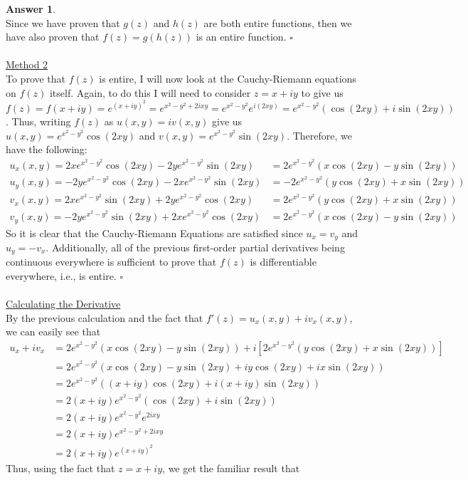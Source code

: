 \documentclass[10pt,a4paper]{article}
\theoremstyle{definition}
\newtheorem*{answer*}{Answer}
\begin{document}
\begin{answer*}{$ $}
\\Since we have proven that $g(z)$ and $h(z)$ are both entire functions, then we have also proven that $f(z) = g(h(z))$ is an entire function. $\square$
\\
\\\underline{Method 2}
\\To prove that $f(z)$ is entire, I will now look at the Cauchy-Riemann equations on $f(z)$ itself. Again, to do this I will need to consider $z = x + iy$ to give us $\displaystyle f(z) = f(x + iy) = e^{(x + iy)^2} = e^{x^2 - y^2 + 2ixy} = e^{x^2 - y^2}e^{i(2xy)} = e^{x^2 - y^2}(\cos(2xy) + i\sin(2xy))$. Thus, writing $f(z)$ as $u(x,y) = iv(x,y)$ give us $u(x,y) = e^{x^2 - y^2}\cos(2xy)$ and $v(x,y) = e^{x^2 - y^2}\sin(2xy)$. Therefore, we have the following:
\begin{align*}
u_x(x,y) = 2xe^{x^2 - y^2}\cos(2xy) - 2ye^{x^2 - y^2}\sin(2xy) &= 2e^{x^2 - y^2}(x\cos(2xy) - y\sin(2xy))\\
u_y(x,y) = -2ye^{x^2 - y^2}\cos(2xy) - 2xe^{x^2 - y^2}\sin(2xy) &= -2e^{x^2 - y^2}(y\cos(2xy) + x\sin(2xy))\\
v_x(x,y) = 2xe^{x^2 - y^2}\sin(2xy) + 2ye^{x^2 - y^2}\cos(2xy) &= 2e^{x^2 - y^2}(y\cos(2xy) + x\sin(2xy))\\
v_y(x,y) = -2ye^{x^2 - y^2}\sin(2xy) + 2xe^{x^2 - y^2}\cos(2xy) &= 2e^{x^2 - y^2}(x\cos(2xy) - y\sin(2xy))
\end{align*}
So it is clear that the Cauchy-Riemann Equations are satisfied since $u_x = v_y$ and $u_y = -v_x$. Additionally, all of the previous first-order partial derivatives being continuous everywhere is sufficient to prove that $f(z)$ is differentiable everywhere, i.e., is entire. $\square$
\\
\\\underline{Calculating the Derivative}
\\By the previous calculation and the fact that $f'(z) = u_x(x,y) + iv_x(x,y)$, we can easily see that
\begin{align*}
u_x + iv_x &= 2e^{x^2 - y^2}(x\cos(2xy) - y\sin(2xy)) + i[2e^{x^2 - y^2}(y\cos(2xy) + x\sin(2xy))]\\
&= 2e^{x^2 - y^2}(x\cos(2xy) - y\sin(2xy) + iy\cos(2xy) + ix\sin(2xy))\\
&= 2e^{x^2 - y^2}((x + iy)\cos(2xy) + i(x + iy)\sin(2xy))\\
&= 2(x + iy)e^{x^2 - y^2}(\cos(2xy) + i\sin(2xy))\\
&= 2(x + iy)e^{x^2 - y^2}e^{2ixy}\\
&= 2(x + iy)e^{x^2 - y^2 + 2ixy}\\
&= 2(x + iy)e^{(x + iy)^2}
\end{align*}
Thus, using the fact that $z = x + iy$, we get the familiar result that 
\end{answer*}
\end{document}
